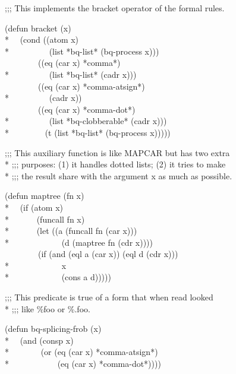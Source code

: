 \begin{new}
\begin{lisp}
\end{lisp}
\begin{lisp}
;;; This implements the bracket operator of the formal rules.
\end{lisp}
\begin{lisp}
(defun bracket (x) \\*
~~(cond ((atom x) \\*
~~~~~~~~~(list *bq-list* (bq-process x))) \\
~~~~~~~~((eq (car x) *comma*) \\*
~~~~~~~~~(list *bq-list* (cadr x))) \\
~~~~~~~~((eq (car x) *comma-atsign*) \\*
~~~~~~~~~(cadr x)) \\
~~~~~~~~((eq (car x) *comma-dot*) \\*
~~~~~~~~~(list *bq-clobberable* (cadr x))) \\*
~~~~~~~~(t (list *bq-list* (bq-process x)))))
\end{lisp}
\begin{lisp}
;;; This auxiliary function is like MAPCAR but has two extra \\*
;;; purposes: (1) it handles dotted lists; (2) it tries to make \\*
;;; the result share with the argument x as much as possible.
\end{lisp}
\begin{lisp}
(defun maptree (fn x) \\*
~~(if (atom x) \\*
~~~~~~(funcall fn x) \\*
~~~~~~(let ((a (funcall fn (car x))) \\*
~~~~~~~~~~~~(d (maptree fn (cdr x)))) \\
~~~~~~~~(if (and (eql a (car x)) (eql d (cdr x))) \\*
~~~~~~~~~~~~x \\*
~~~~~~~~~~~~(cons a d)))))
\end{lisp}
\begin{lisp}
;;; This predicate is true of a form that when read looked \\*
;;; like \%{\Xatsign}foo or \%.foo.
\end{lisp}
\begin{lisp}
(defun bq-splicing-frob (x) \\*
~~(and (consp x) \\*
~~~~~~~(or (eq (car x) *comma-atsign*) \\*
~~~~~~~~~~~(eq (car x) *comma-dot*))))

\end{lisp}
\end{new}
